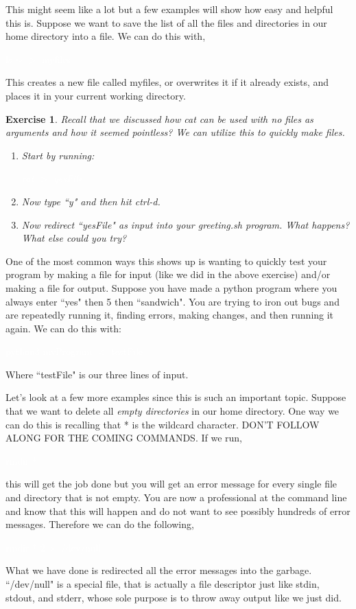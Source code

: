 \documentclass[oneside]{book}
\newcommand{\commandline}[1]{\begin{center} \colorbox{Dark}{\textcolor{white}{#1}} \end{center}}
\newtheorem{ex}{Exercise}[chapter]
\begin{document}
        This might seem like a lot but a few examples will show how easy and helpful this is. Suppose we want to save the list of all the files and directories in our home directory into a file. We can do this with,
        \commandline{ls $\sim$ $>$ myfiles}
        This creates a new file called myfiles, or overwrites it if it already exists, and places it in your current working directory.
        \begin{ex}
            Recall that we discussed how cat can be used with no files as arguments and how it seemed pointless? We can utilize this to quickly make files.
            \begin{enumerate}
                \item Start by running:
                    \commandline{cat $>$ yesFile}
                \item Now type ``y" and then hit ctrl-d.
                \item Now redirect ``yesFile" as input into your greeting.sh program. What happens? What else could you try?
            \end{enumerate}
        \end{ex}
        
        One of the most common ways this shows up is wanting to quickly test your program by making a file for input (like we did in the above exercise) and/or making a file for output. Suppose you have made a python program where you always enter ``yes" then 5 then ``sandwich". You are trying to iron out bugs and are repeatedly running it, finding errors, making changes, and then running it again. We can do this with:
        \commandline{python3 myProgram $<$ testFile}
        Where ``testFile" is our three lines of input. 
        
        Let's look at a few more examples since this is such an important topic. Suppose that we want to delete all \textit{empty directories} in our home directory. One way we can do this is recalling that * is the wildcard character. DON'T FOLLOW ALONG FOR THE COMING COMMANDS. If we run,
        \commandline{rmdir *}
        this will get the job done but you will get an error message for every single file and directory that is not empty. You are now a professional at the command line and know that this will happen and do not want to see possibly hundreds of error messages. Therefore we can do the following,
        \commandline{rmdir * $2>$ /dev/null}
        What we have done is redirected all the error messages into the garbage. ``/dev/null" is a special file, that is actually a file descriptor just like stdin, stdout, and stderr, whose sole purpose is to throw away output like we just did.
 
\end{document}
